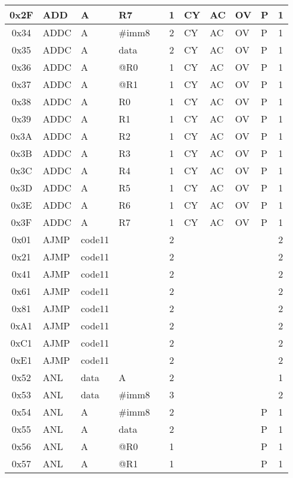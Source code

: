 \documentclass[a4paper,twoside,12pt]{book}
\begin{document}
{\begin{longtable}{|c|l|lll|c|llll|c|}
		0x2F	& ADD	& A	& R7	&	& 1	& CY	& AC	& OV	& P	& 1	\\\hline
		0x34	& ADDC	& A	& \#imm8&	& 2	& CY	& AC	& OV	& P	& 1	\\\hline
		0x35	& ADDC	& A	& data	&	& 2	& CY	& AC	& OV	& P	& 1	\\\hline
		0x36	& ADDC	& A	& @R0	&	& 1	& CY	& AC	& OV	& P	& 1	\\\hline
		0x37	& ADDC	& A	& @R1	&	& 1	& CY	& AC	& OV	& P	& 1	\\\hline
		0x38	& ADDC	& A	& R0	&	& 1	& CY	& AC	& OV	& P	& 1	\\\hline
		0x39	& ADDC	& A	& R1	&	& 1	& CY	& AC	& OV	& P	& 1	\\\hline
		0x3A	& ADDC	& A	& R2	&	& 1	& CY	& AC	& OV	& P	& 1	\\\hline
		0x3B	& ADDC	& A	& R3	&	& 1	& CY	& AC	& OV	& P	& 1	\\\hline
		0x3C	& ADDC	& A	& R4	&	& 1	& CY	& AC	& OV	& P	& 1	\\\hline
		0x3D	& ADDC	& A	& R5	&	& 1	& CY	& AC	& OV	& P	& 1	\\\hline
		0x3E	& ADDC	& A	& R6	&	& 1	& CY	& AC	& OV	& P	& 1	\\\hline
		0x3F	& ADDC	& A	& R7	&	& 1	& CY	& AC	& OV	& P	& 1	\\\hline
		0x01	& AJMP	& code11&	&	& 2	&	&	&	&	& 2	\\\hline
		0x21	& AJMP	& code11&	&	& 2	&	&	&	&	& 2	\\\hline
		0x41	& AJMP	& code11&	&	& 2	&	&	&	&	& 2	\\\hline
		0x61	& AJMP	& code11&	&	& 2	&	&	&	&	& 2	\\\hline
		0x81	& AJMP	& code11&	&	& 2	&	&	&	&	& 2	\\\hline
		0xA1	& AJMP	& code11&	&	& 2	&	&	&	&	& 2	\\\hline
		0xC1	& AJMP	& code11&	&	& 2	&	&	&	&	& 2	\\\hline
		0xE1	& AJMP	& code11&	&	& 2	&	&	&	&	& 2	\\\hline
		0x52	& ANL	& data	& A	&	& 2	&	&	&	&	& 1	\\\hline
		0x53	& ANL	& data	& \#imm8&	& 3	&	&	&	&	& 2	\\\hline
		0x54	& ANL	& A	& \#imm8&	& 2	&	&	&	& P	& 1	\\\hline
		0x55	& ANL	& A	& data	&	& 2	&	&	&	& P	& 1	\\\hline
		0x56	& ANL	& A	& @R0	&	& 1	&	&	&	& P	& 1	\\\hline
		0x57	& ANL	& A	& @R1	&	& 1	&	&	&	& P	& 1	\\\hline

\end{longtable}}
\end{document}
